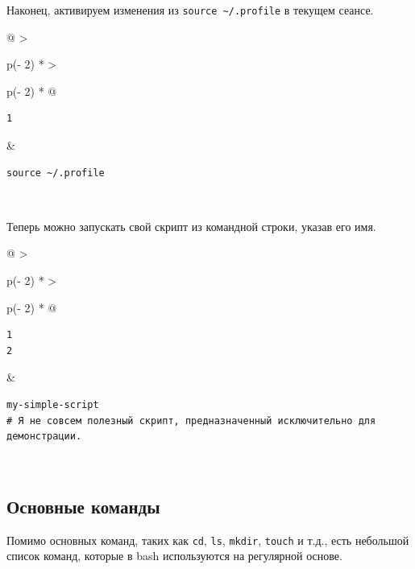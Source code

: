 \documentclass{article}
\begin{document}
Наконец, активируем изменения из
\texttt{source\ \textasciitilde{}/.profile} в текущем сеансе.

\begin{longtable}[]{@{}
  >{\raggedright\arraybackslash}p{(\columnwidth - 2\tabcolsep) * }
  >{\raggedright\arraybackslash}p{(\columnwidth - 2\tabcolsep) * }@{}}
\toprule
\endhead
\begin{minipage}[t]{\linewidth}\raggedright
\begin{verbatim}
1
\end{verbatim}
\end{minipage} & \begin{minipage}[t]{\linewidth}\raggedright
\begin{verbatim}
source ~/.profile
\end{verbatim}
\end{minipage} \\ \addlinespace
\bottomrule
\end{longtable}

Теперь можно запускать свой скрипт из командной строки, указав его имя.

\begin{longtable}[]{@{}
  >{\raggedright\arraybackslash}p{(\columnwidth - 2\tabcolsep) * }
  >{\raggedright\arraybackslash}p{(\columnwidth - 2\tabcolsep) * }@{}}
\toprule
\endhead
\begin{minipage}[t]{\linewidth}\raggedright
\begin{verbatim}
1
2
\end{verbatim}
\end{minipage} & \begin{minipage}[t]{\linewidth}\raggedright
\begin{verbatim}
my-simple-script
# Я не совсем полезный скрипт, предназначенный исключительно для демонстрации.
\end{verbatim}
\end{minipage} \\ \addlinespace
\bottomrule
\end{longtable}

\hypertarget{Common-Commands}{%
\subsection{\texorpdfstring{\protect\hyperlink{Common-Commands}{}Основные
команды}{Основные команды}}\label{Common-Commands}}

Помимо основных команд, таких как \texttt{cd}, \texttt{ls},
\texttt{mkdir}, \texttt{touch} и т.д., есть небольшой список команд,
которые в bash используются на регулярной основе.
\end{document}
